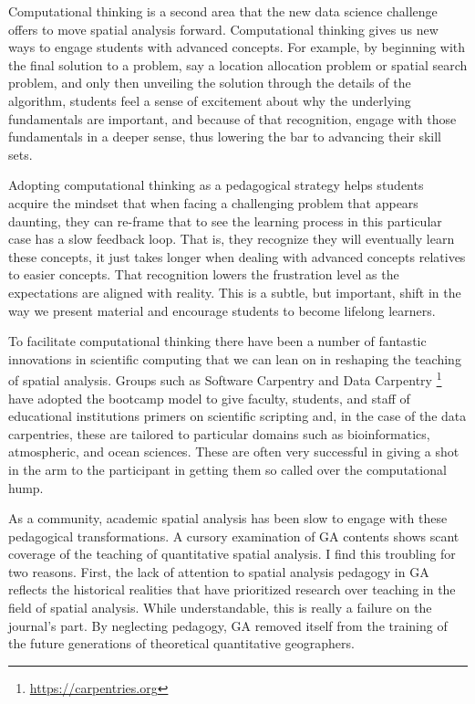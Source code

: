 \documentclass[11pt]{article}
\begin{document}
Computational thinking \cite{Barba_2016} is a second area that the new data
science challenge offers to move spatial analysis forward. Computational
thinking gives us new ways to engage students with advanced concepts. For
example, by beginning with the final solution to a problem, say a location
allocation problem or spatial search problem, and only then unveiling the
solution through the details of the algorithm, students feel a sense of
excitement about why the underlying fundamentals are important, and because of
that recognition, engage with those fundamentals in a deeper sense, thus
lowering the bar to advancing their skill sets.

Adopting computational thinking as a pedagogical strategy helps students
acquire the mindset that when facing a challenging problem that appears
daunting, they can re-frame that to see the learning process in this particular
case has a slow feedback loop. That is, they recognize they will eventually
learn these concepts, it just takes longer when dealing with advanced concepts
relatives to easier concepts. That recognition lowers the frustration level
as the expectations are aligned with reality. This is a subtle, but important,
shift in the way we present material and encourage students to become
lifelong learners.

To facilitate computational thinking there have been a number of fantastic
innovations in scientific computing that we can lean on in reshaping the
teaching of spatial analysis. Groups such as Software Carpentry and Data
Carpentry \footnote{\url{https://carpentries.org}} have adopted the bootcamp
model to give faculty, students, and staff of educational institutions primers
on scientific scripting and, in the case of the data carpentries,
these are tailored to particular domains such as bioinformatics, atmospheric,
and ocean sciences. These are often very successful in giving a shot in the arm
to the participant in getting them so called over the computational hump.

As a community, academic spatial analysis has been slow to engage with these
pedagogical transformations. A cursory examination of GA contents shows scant
coverage of the teaching of quantitative spatial analysis. I find this troubling
for two reasons. First, the lack of attention to spatial analysis pedagogy in GA
reflects the historical realities  that have prioritized research over teaching in
the field of spatial analysis. While understandable, this is really a failure on
the journal's part. By neglecting pedagogy, GA removed itself from the training
of the future generations of theoretical quantitative geographers.
\end{document}
